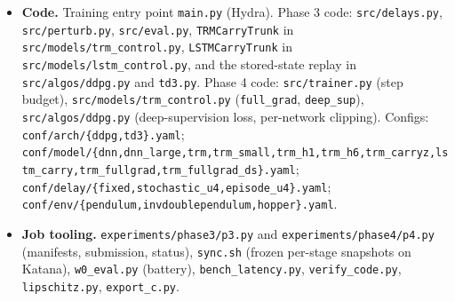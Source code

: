 \documentclass[11pt]{article}
\begin{document}
\begin{itemize}
\item \textbf{Code.} Training entry point \texttt{main.py} (Hydra). Phase 3 code: \texttt{src/delays.py}, \texttt{src/\allowbreak{}perturb.\allowbreak{}py}, \texttt{src/eval.py}, \texttt{TRMCarryTrunk} in \texttt{src/\allowbreak{}models/\allowbreak{}trm\_\allowbreak{}control.\allowbreak{}py}, \texttt{LSTMCarryTrunk} in \texttt{src/\allowbreak{}models/\allowbreak{}lstm\_\allowbreak{}control.\allowbreak{}py}, and the stored-state replay in \texttt{src/\allowbreak{}algos/\allowbreak{}ddpg.\allowbreak{}py} and \texttt{td3.py}. Phase 4 code: \texttt{src/\allowbreak{}trainer.\allowbreak{}py} (step budget), \texttt{src/\allowbreak{}models/\allowbreak{}trm\_\allowbreak{}control.\allowbreak{}py} (\texttt{full\_grad}, \texttt{deep\_sup}), \texttt{src/\allowbreak{}algos/\allowbreak{}ddpg.\allowbreak{}py} (deep-supervision loss, per-network clipping). Configs: \texttt{conf/\allowbreak{}arch/\allowbreak{}\{ddpg,\allowbreak{}td3\}.\allowbreak{}yaml}; \texttt{conf/\allowbreak{}model/\allowbreak{}\{dnn,\allowbreak{}dnn\_\allowbreak{}large,\allowbreak{}trm,\allowbreak{}trm\_\allowbreak{}small,\allowbreak{}trm\_\allowbreak{}h1,\allowbreak{}trm\_\allowbreak{}h6,\allowbreak{}trm\_\allowbreak{}carryz,\allowbreak{}lstm\_\allowbreak{}carry,\allowbreak{}trm\_\allowbreak{}fullgrad,\allowbreak{}trm\_\allowbreak{}fullgrad\_\allowbreak{}ds\}.\allowbreak{}yaml}; \texttt{conf/\allowbreak{}delay/\allowbreak{}\{fixed,\allowbreak{}stochastic\_\allowbreak{}u4,\allowbreak{}episode\_\allowbreak{}u4\}.\allowbreak{}yaml}; \texttt{conf/\allowbreak{}env/\allowbreak{}\{pendulum,\allowbreak{}invdoublependulum,\allowbreak{}hopper\}.\allowbreak{}yaml}.
\item \textbf{Job tooling.} \texttt{experiments/\allowbreak{}phase3/\allowbreak{}p3.\allowbreak{}py} and \texttt{experiments/\allowbreak{}phase4/\allowbreak{}p4.\allowbreak{}py} (manifests, submission, status), \texttt{sync.sh} (frozen per-stage snapshots on Katana), \texttt{w0\_eval.py} (battery), \texttt{bench\_\allowbreak{}latency.\allowbreak{}py}, \texttt{verify\_\allowbreak{}code.\allowbreak{}py}, \texttt{lipschitz.py}, \texttt{export\_c.py}.

\end{itemize}
\end{document}
